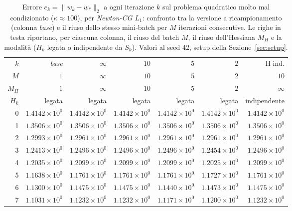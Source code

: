 \begin{table}[H]
\centering
\footnotesize
\renewcommand{\arraystretch}{0.85}
\setlength{\tabcolsep}{2pt}
\caption{Errore $e_k=\|w_k-w_*\|_2$ a ogni iterazione $k$ sul problema quadratico molto mal condizionato ($\kappa\approx 100$), per \emph{Newton-CG $L_1$}: confronto tra la versione a ricampionamento (colonna \emph{base}) e il riuso dello stesso mini-batch per $M$ iterazioni consecutive. Le righe in testa riportano, per ciascuna colonna, il riuso del batch $M$, il riuso dell'Hessiana $M_H$ e la modalità ($H_k$ legata o indipendente da $S_k$). Valori al seed 42, setup della Sezione~\ref{sec:setup}.}
\label{tab:riuso_veryill_l1}
\begin{tabular}{@{}rrrrrrr@{}}
\toprule
$k$ & \emph{base} & $\infty$ & $10$ & $5$ & $2$ & H ind.\\
$M$ & $1$ & $\infty$ & $10$ & $5$ & $2$ & $10$\\
$M_H$ & $1$ & $\infty$ & $10$ & $5$ & $2$ & $\infty$\\
$H_k$ & legata & legata & legata & legata & legata & indipendente\\
\midrule
0 & $1.4142\times10^{0}$ & $1.4142\times10^{0}$ & $1.4142\times10^{0}$ & $1.4142\times10^{0}$ & $1.4142\times10^{0}$ & $1.4142\times10^{0}$\\
1 & $1.3506\times10^{0}$ & $1.3506\times10^{0}$ & $1.3506\times10^{0}$ & $1.3506\times10^{0}$ & $1.3506\times10^{0}$ & $1.3506\times10^{0}$\\
2 & $1.2993\times10^{0}$ & $1.2961\times10^{0}$ & $1.2961\times10^{0}$ & $1.2961\times10^{0}$ & $1.2961\times10^{0}$ & $1.2961\times10^{0}$\\
3 & $1.2413\times10^{0}$ & $1.2496\times10^{0}$ & $1.2496\times10^{0}$ & $1.2496\times10^{0}$ & $1.2454\times10^{0}$ & $1.2496\times10^{0}$\\
4 & $1.2035\times10^{0}$ & $1.2099\times10^{0}$ & $1.2099\times10^{0}$ & $1.2099\times10^{0}$ & $1.2025\times10^{0}$ & $1.2099\times10^{0}$\\
5 & $1.1638\times10^{0}$ & $1.1761\times10^{0}$ & $1.1761\times10^{0}$ & $1.1761\times10^{0}$ & $1.1727\times10^{0}$ & $1.1761\times10^{0}$\\
6 & $1.1300\times10^{0}$ & $1.1475\times10^{0}$ & $1.1475\times10^{0}$ & $1.1440\times10^{0}$ & $1.1473\times10^{0}$ & $1.1475\times10^{0}$\\
7 & $1.1031\times10^{0}$ & $1.1232\times10^{0}$ & $1.1232\times10^{0}$ & $1.1171\times10^{0}$ & $1.1200\times10^{0}$ & $1.1232\times10^{0}$\\

\end{tabular}
\end{table}
